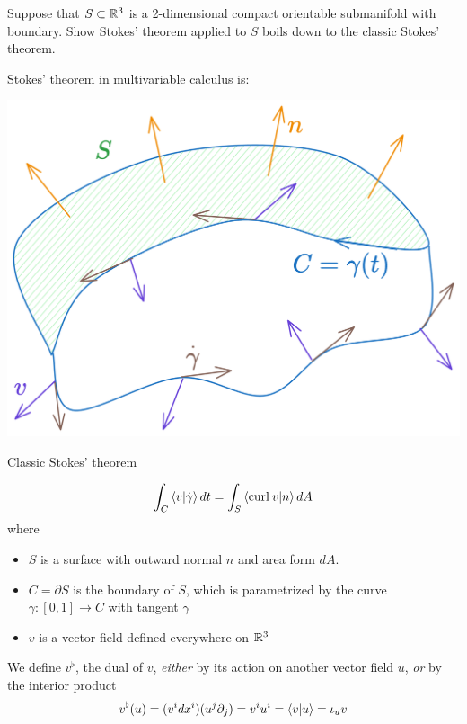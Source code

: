 \documentclass[10pt]{article}
\begin{document}
\begin{example}
	Suppose that $S \subset \mathbb{R}^3$ is a 2-dimensional compact orientable submanifold with boundary. Show Stokes' theorem applied to $S$ boils down to the classic Stokes' theorem.
\end{example}
\sol Stokes' theorem in multivariable calculus is:
\begin{marginfigure}
	\begin{center}
		\vspace*{35px}\hspace*{-32px}
		\includegraphics[width=1.5\textwidth]{figs/stokes.png}
	\end{center}
	\caption{Classic Stokes' theorem}
\end{marginfigure}
$$
\int_C \ip{v}{\dot\gamma}dt = \int_S\ip{{\rm curl }\:v}{n}dA
$$
where 
\begin{itemize}
	\item $S$ is a surface with outward normal $n$ and area form $dA$.
	\item $C = \partial S$ is the boundary of $S$, which is parametrized by the curve $\gamma:[0,1]\to C$ with tangent $\dot\gamma$
	\item $v$ is a vector field defined everywhere on $\mathbb{R}^3$
\end{itemize}
We define $v^\flat$, the dual of $v$, \emph{either} by its action on another vector field $u$, \emph{or} by the interior product
$$
	v^\flat(u) = (v^idx^i)(u^j\partial_j) = v^iu^i = \ip{v}{u} = \iota_u v
$$
\end{document}
